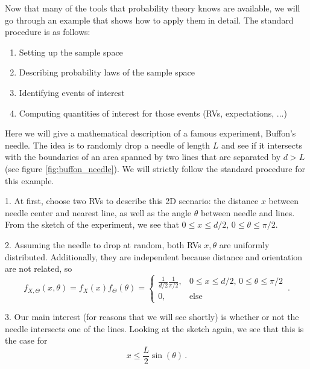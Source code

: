 Now that many of the tools that probability theory knows are available, we will go through an example that shows how to apply them in detail. The standard procedure is as follows:
\begin{enumerate}
\item Setting up the sample space

\item Describing probability laws of the sample space

\item Identifying events of interest

\item Computing quantities of interest for those events (RVs, expectations, ...)
\end{enumerate}


\begin{ex}
Here we will give a mathematical description of a famous experiment, Buffon's needle. The idea is to randomly drop a needle of length $L$ and see if it intersects with the boundaries of an area spanned by two lines that are separated by $d > L$ (see figure \ref{fig:buffon_needle}). We will strictly follow the standard procedure for this example.

1. At first, choose two RVs to describe this 2D scenario: the distance $x$ between needle center and nearest line, as well as the angle $\theta$ between needle and lines. From the sketch of the experiment, we see that $0 \leq x \leq d / 2, \, 0 \leq \theta \leq \pi / 2$.

2. Assuming the needle to drop at random, both RVs $x, \theta$ are uniformly distributed. Additionally, they are independent because distance and orientation are not related, so
\begin{equation*}
f_{X, \Theta}(x, \theta) = f_X(x) f_\Theta(\theta) = \begin{cases} \frac{1}{d / 2} \frac{1}{\pi / 2}, & 0 \leq x \leq d / 2, \, 0 \leq \theta \leq \pi / 2 \\ 0, & \text{else} \end{cases} \, .
\end{equation*}

3. Our main interest (for reasons that we will see shortly) is whether or not the needle intersects one of the lines. Looking at the sketch again, we see that this is the case for
\begin{equation*}
x \leq \frac{L}{2} \sin(\theta) \, .
\end{equation*}


\end{ex}
